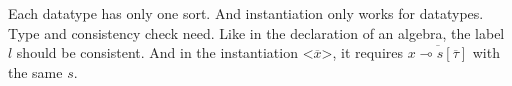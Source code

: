 \documentclass[a4paper]{article}
\begin{document}
Each datatype has only one sort. And instantiation only works for datatypes.\\

Type and consistency check need. Like in the declaration of an algebra, the label $l$ should be consistent. And in the instantiation $\texttt{<}\overline{x}\texttt{>}$, it requires $\overline{x \multimap s[\overline{\tau}]}$ with the same $s$.
\end{document}
